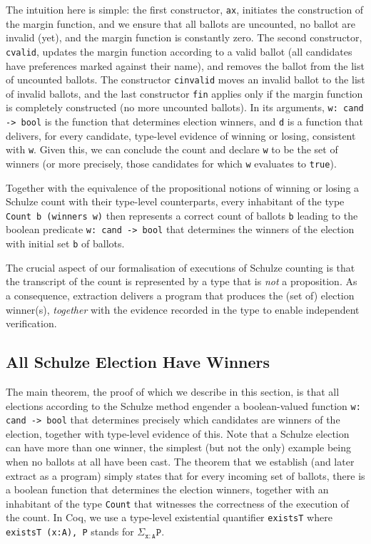 \noindent
The intuition here is simple: the first constructor, \texttt{ax},
initiates the construction of the margin function, and we ensure
that all ballots are uncounted, no ballot are invalid (yet), and the
margin function is constantly zero. The second constructor,
\texttt{cvalid}, updates the margin function according to a valid
ballot (all candidates have preferences marked against their name),
and removes the ballot from the list of uncounted ballots. The
constructor \texttt{cinvalid} moves an invalid ballot to the list of
invalid ballots, and the last constructor \texttt{fin} applies only
if the margin function is completely constructed (no more uncounted
ballots). In its arguments, \texttt{w: cand -> bool} is the function
that determines election winners, and \texttt{d} is a function that
delivers, for every candidate, type-level evidence of winning or
losing, consistent with \texttt{w}. Given this, we can conclude the
count and declare \texttt{w} to be the set of winners (or more
precisely, those candidates for which \texttt{w} evaluates to
\texttt{true}). 

Together with the equivalence of the propositional notions of
winning or losing a Schulze count with their type-level
counterparts, every inhabitant of the type \texttt{Count b (winners
w)} then represents a correct count of ballots \texttt{b} leading to
the boolean predicate \texttt{w: cand -> bool} that determines the
winners of the election with initial set \texttt{b} of ballots.

The crucial aspect of our formalisation of executions of Schulze
counting is that the transcript of the count is represented by a
type that is \emph{not} a proposition. As a consequence, extraction
delivers a program that produces the (set of) election winner(s),
\emph{together} with the evidence recorded in the type to enable
independent verification.




\subsection{All Schulze Election Have Winners}
\label{sec:all_winners}
The main theorem, the proof of which we describe in this section, is
that all elections according to the Schulze method engender a
boolean-valued function \texttt{w: cand -> bool}
that determines
precisely which candidates are winners of the election, together
with type-level evidence of this.
Note that a Schulze election can have more
than one winner, the simplest (but not the only) example being when
no ballots at all have been cast.
The theorem that we establish (and later extract as a program)
simply states that for every incoming set of ballots, there is a
boolean function that determines the election winners, together with
an inhabitant of the type \texttt{Count} that witnesses the
correctness of the execution of the count. In Coq, we use a
type-level existential quantifier \texttt{existsT} where
\texttt{existsT (x:A), P} stands for $\Sigma_{\mathtt{x:A}}
\texttt{P}$.

